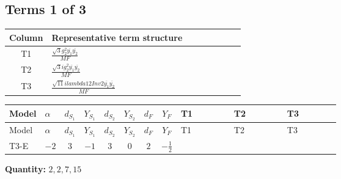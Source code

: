 \documentclass[8pt]{article}
\begin{document}
\begin{landscape}
\subsection*{Terms 1 of 3}
\begin{center}
\begin{tabular}{@{}c >{\raggedright\arraybackslash}p{0.82\linewidth}@{}}
\toprule
Column & Representative term structure \\
\midrule
T1 & \(\displaystyle \frac{\sqrt{3} g_{2}^{2} \overline{y_{1}} \overline{y_{2}}}{MF}\) \\
\midrule
T2 & \(\displaystyle \frac{\sqrt{3} i g_{2}^{2} \overline{y_{1}} \overline{y_{2}}}{MF}\) \\
\midrule
T3 & \(\displaystyle \frac{\sqrt{11} i lambda12Inv2 \overline{y_{1}} \overline{y_{2}}}{MF}\) \\
\midrule
\bottomrule
\end{tabular}
\end{center}
\smallskip
\tiny
\begin{longtable}{@{}llcccccc >{\raggedright\arraybackslash}p{0.21\linewidth} >{\raggedright\arraybackslash}p{0.21\linewidth} >{\raggedright\arraybackslash}p{0.21\linewidth}@{}}
\toprule
Model & $\alpha$ & $d_{S_1}$ & $Y_{S_1}$ & $d_{S_2}$ & $Y_{S_2}$ & $d_F$ & $Y_F$ & T1 & T2 & T3 \\
\midrule
\endfirsthead
\toprule
Model & $\alpha$ & $d_{S_1}$ & $Y_{S_1}$ & $d_{S_2}$ & $Y_{S_2}$ & $d_F$ & $Y_F$ & T1 & T2 & T3 \\
\midrule
\endhead
T3-E & $-2$ & $3$ & $-1$ & $3$ & $0$ & $2$ & $-\frac{1}{2}$ & \scriptsize\adjustbox{max width=\linewidth}{$\begin{gathered} \frac{\sqrt{3} g_{2}^{2} \overline{y_{1}} \overline{y_{2}}}{6 MF}\end{gathered}$} & \scriptsize\adjustbox{max width=\linewidth}{$\begin{gathered} - \frac{49 \sqrt{3} i g_{2}^{2} \overline{y_{1}} \overline{y_{2}}}{24 MF}\end{gathered}$} & \scriptsize\adjustbox{max width=\linewidth}{$\begin{gathered} - \frac{3 \sqrt{11} i lambda12Inv2 \overline{y_{1}} \overline{y_{2}}}{22 MF}\end{gathered}$} \\
\midrule
\bottomrule
\end{longtable}
\clearpage
\noindent\textbf{Quantity: }$\mathrm{2,2,7,15}$\par\smallskip

\end{landscape}
\end{document}

